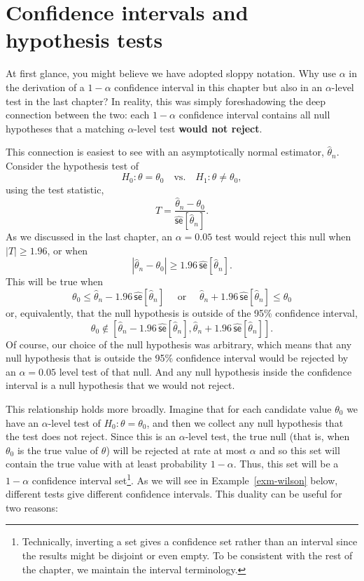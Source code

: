 \documentclass[
  13pt,
  letterpaper,
  DIV=11,
  numbers=noendperiod]{scrreprt}
\newcommand{\se}{\textsf{se}}
\theoremstyle{plain}
\theoremstyle{plain}
\theoremstyle{definition}
\theoremstyle{definition}
\theoremstyle{remark}
\begin{document}
\section{Confidence intervals and hypothesis
tests}\label{confidence-intervals-and-hypothesis-tests}

At first glance, you might believe we have adopted sloppy notation. Why
use \(\alpha\) in the derivation of a \(1 - \alpha\) confidence interval
in this chapter but also in an \(\alpha\)-level test in the last
chapter? In reality, this was simply foreshadowing the deep connection
between the two: each \(1-\alpha\) confidence interval contains all null
hypotheses that a matching \(\alpha\)-level test \textbf{would not
reject}.

This connection is easiest to see with an asymptotically normal
estimator, \(\widehat{\theta}_n\). Consider the hypothesis test of \[ 
H_0: \theta = \theta_0 \quad \text{vs.}\quad H_1: \theta \neq \theta_0,
\] using the test statistic, \[ 
T = \frac{\widehat{\theta}_{n} - \theta_{0}}{\widehat{\se}[\widehat{\theta}_{n}]}. 
\] As we discussed in the last chapter, an \(\alpha = 0.05\) test would
reject this null when \(|T| \geq 1.96\), or when \[ 
|\widehat{\theta}_{n} - \theta_{0}| \geq 1.96\, \widehat{\se}[\widehat{\theta}_{n}]. 
\] This will be true when \[ 
\theta_{0} \leq \widehat{\theta}_{n} - 1.96\,\widehat{\se}[\widehat{\theta}_{n}]\quad \text{ or }\quad \widehat{\theta}_{n} + 1.96\,\widehat{\se}[\widehat{\theta}_{n}] \leq \theta_{0}
\] or, equivalently, that the null hypothesis is outside of the 95\%
confidence interval, \[
\theta_0 \notin \left[\widehat{\theta}_{n} - 1.96\,\widehat{\se}[\widehat{\theta}_{n}], \widehat{\theta}_{n} + 1.96\,\widehat{\se}[\widehat{\theta}_{n}]\right].
\] Of course, our choice of the null hypothesis was arbitrary, which
means that any null hypothesis that is outside the 95\% confidence
interval would be rejected by an \(\alpha = 0.05\) level test of that
null. And any null hypothesis inside the confidence interval is a null
hypothesis that we would not reject.

This relationship holds more broadly. Imagine that for each candidate
value \(\theta_0\) we have an \(\alpha\)-level test of
\(H_0: \theta = \theta_0\), and then we collect any null hypothesis that
the test does not reject. Since this is an \(\alpha\)-level test, the
true null (that is, when \(\theta_0\) is the true value of \(\theta\))
will be rejected at rate at most \(\alpha\) and so this set will contain
the true value with at least probability \(1-\alpha\). Thus, this set
will be a \(1-\alpha\) confidence interval set\footnote{Technically,
  inverting a set gives a confidence set rather than an interval since
  the results might be disjoint or even empty. To be consistent with the
  rest of the chapter, we maintain the interval terminology.}. As we
will see in Example~\ref{exm-wilson} below, different tests give
different confidence intervals. This duality can be useful for two
reasons:
\end{document}
